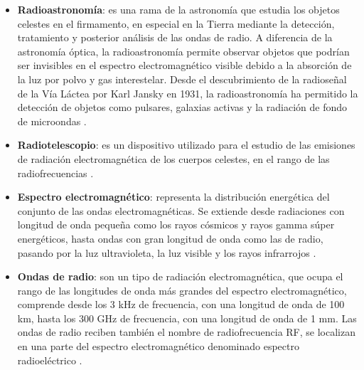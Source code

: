
\begin{itemize}
    \item \textbf{Radioastronomía}: es una rama de la astronomía que estudia los objetos celestes
    en el firmamento, en especial en la Tierra mediante la detección, tratamiento
    y posterior análisis de las ondas de radio.
    A diferencia de la astronomía óptica, la radioastronomía permite observar
    objetos que podrían ser invisibles en el espectro electromagnético visible
    debido a la absorción de la luz por polvo y gas interestelar. Desde el
    descubrimiento de la radioseñal de la Vía Láctea por Karl Jansky en 1931, la
    radioastronomía ha permitido la detección de objetos como pulsares, galaxias
    activas y la radiación de fondo de microondas \cite{wilson2013radioastronomy}.

    \item \textbf{Radiotelescopio}: es un dispositivo utilizado para el estudio de las emisiones de
    radiación electromagnética de los cuerpos celestes, en el rango de las radiofrecuencias 
    \cite{ordonez2018radiotelescopio}.

    \item \textbf{Espectro electromagnético}: representa la distribución energética del conjunto de las
    ondas electromagnéticas. Se extiende desde radiaciones con longitud de onda pequeña
    como los rayos cósmicos y rayos gamma súper energéticos, hasta ondas con gran longitud
    de onda como las de radio, pasando por la luz ultravioleta, la luz visible y los rayos
    infrarrojos \cite{ordonez2018radiotelescopio}.

    \item \textbf{Ondas de radio}: son un tipo de radiación electromagnética, que ocupa el rango de
    las longitudes de onda más grandes del espectro electromagnético, comprende desde
    los 3 kHz de frecuencia, con una longitud de onda de 100 km, hasta los 300 GHz de
    frecuencia, con una longitud de onda de 1 mm. Las ondas de radio reciben también el
    nombre de radiofrecuencia RF, se localizan en una parte del espectro electromagnético
    denominado espectro radioeléctrico \cite{ventanas2017ondas}.

    
\end{itemize}



